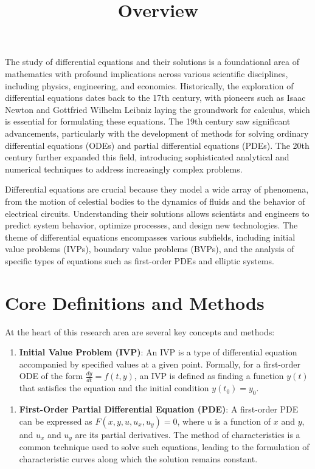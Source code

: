 \documentclass[11pt,a4paper]{article}
\title{Overview}
\date{}
\begin{document}
\maketitle

The study of differential equations and their solutions is a foundational area of mathematics with profound implications across various scientific disciplines, including physics, engineering, and economics. Historically, the exploration of differential equations dates back to the 17th century, with pioneers such as Isaac Newton and Gottfried Wilhelm Leibniz laying the groundwork for calculus, which is essential for formulating these equations. The 19th century saw significant advancements, particularly with the development of methods for solving ordinary differential equations (ODEs) and partial differential equations (PDEs). The 20th century further expanded this field, introducing sophisticated analytical and numerical techniques to address increasingly complex problems.

Differential equations are crucial because they model a wide array of phenomena, from the motion of celestial bodies to the dynamics of fluids and the behavior of electrical circuits. Understanding their solutions allows scientists and engineers to predict system behavior, optimize processes, and design new technologies. The theme of differential equations encompasses various subfields, including initial value problems (IVPs), boundary value problems (BVPs), and the analysis of specific types of equations such as first-order PDEs and elliptic systems.

\section{Core Definitions and Methods}

At the heart of this research area are several key concepts and methods:

\begin{enumerate}
\item \textbf{Initial Value Problem (IVP)}: An IVP is a type of differential equation accompanied by specified values at a given point. Formally, for a first-order ODE of the form \( \frac{dy}{dt} = f(t, y) \), an IVP is defined as finding a function \( y(t) \) that satisfies the equation and the initial condition \( y(t_0) = y_0 \).
\end{enumerate}

\begin{enumerate}
\item \textbf{First-Order Partial Differential Equation (PDE)}: A first-order PDE can be expressed as \( F(x, y, u, u_x, u_y) = 0 \), where \( u \) is a function of \( x \) and \( y \), and \( u_x \) and \( u_y \) are its partial derivatives. The method of characteristics is a common technique used to solve such equations, leading to the formulation of characteristic curves along which the solution remains constant.
\end{enumerate}
\end{document}
